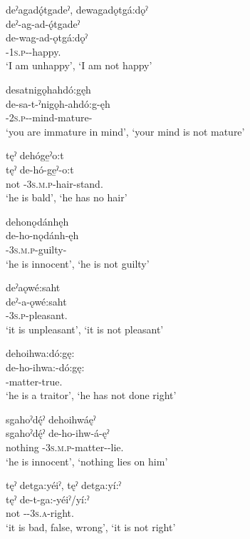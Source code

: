 \ex deˀagadǫ́tgadeˀ, dewagadǫtgá:dǫˀ \\
\glll deˀ-ag-ad-ǫ́tgadeˀ\\
de-wag-ad-ǫtgá:dǫˀ\\
{\negative}-\textsc{1s.p}-{\semireflexive}-happy.{\stative}\\
\glt ‘I am unhappy’, `I am not happy'

\ex desatnigǫhahdó:gęh \\
\gll de-sa-t-ˀnigǫh-ahdó:g-ęh\\
{\negative}-\textsc{2s.p}-{\semireflexive}-mind-mature-{\stative}\\
\glt ‘you are immature in mind’, `your mind is not mature'

\ex tęˀ dehóge̱ˀo:t \\
\gll tęˀ de-hó-ge̱ˀ-o:t\\
not {\negative}-\textsc{3s.m.p}-hair-stand.{\stative}\\
\glt ‘he is bald’, ‘he has no hair’

\ex dehonǫdánhęh \\
\gll de-ho-nǫdánh-ęh\\
{\negative}-\textsc{3s.m.p}-guilty-{\stative}\\
\glt ‘he is innocent’, `he is not guilty'

\ex deˀaǫwé:saht \\
\gll deˀ-a-ǫwé:saht\\
{\negative}-\textsc{3s.p}-pleasant.{\stative}\\
\glt ‘it is unpleasant’, `it is not pleasant'

\ex dehoihwa:dó:gę: \\
\gll de-ho-ihwa:-dó:gę:\\
{\negative}-matter-true.{\stative}\\
\glt ‘he is a traitor’, `he has not done right'

\ex sgahoˀdę́ˀ dehoihwáęˀ \\
\gll sgahoˀdę́ˀ de-ho-ihw-á-ęˀ\\
nothing {\negative}-\textsc{3s.m.p}-matter-{\joinerA}-lie.{\stative}\\
\glt ‘he is innocent’, `nothing lies on him'

\ex tęˀ detga:yéiˀ, tęˀ detga:yí:ˀ \\
\gll tęˀ de-t-ga:-yéiˀ/yí:ˀ\\
not {\negative}-{\cislocative}-\textsc{3s.a}-right.{\stative}\\
\glt ‘it is bad, false, wrong’, `it is not right'

